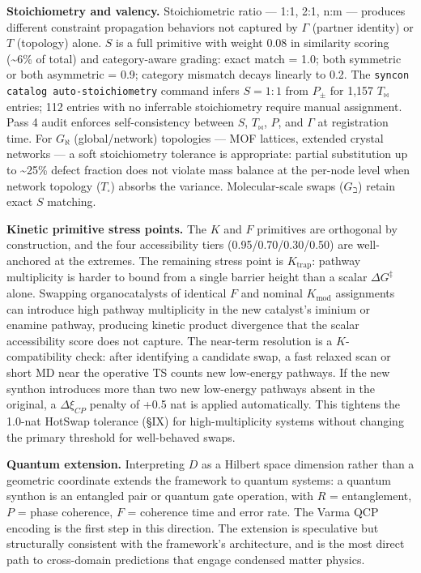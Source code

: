 \documentclass[12pt,a4paper]{article}
\begin{document}
\textbf{Stoichiometry and valency.} Stoichiometric ratio --- 1:1, 2:1, n:m --- produces different constraint propagation behaviors not captured by $\Gamma$ (partner identity) or $T$ (topology) alone. $S$ is a full primitive with weight 0.08 in similarity scoring (\textasciitilde{}6\% of total) and category-aware grading: exact match = 1.0; both symmetric or both asymmetric = 0.9; category mismatch decays linearly to 0.2. The \texttt{syncon catalog auto-stoichiometry} command infers $S = 1:1$ from $P_{\pm}$ for 1,157 $T_{\bowtie}$ entries; 112 entries with no inferrable stoichiometry require manual assignment. Pass 4 audit enforces self-consistency between $S$, $T_{\bowtie}$, $P$, and $\Gamma$ at registration time. For $G_{\aleph}$ (global/network) topologies --- MOF lattices, extended crystal networks --- a soft stoichiometry tolerance is appropriate: partial substitution up to \textasciitilde{}25\% defect fraction does not violate mass balance at the per-node level when network topology ($T_{\square}$) absorbs the variance. Molecular-scale swaps ($G_{\beth}$) retain exact $S$ matching.

\textbf{Kinetic primitive stress points.} The $K$ and $F$ primitives are orthogonal by construction, and the four accessibility tiers (0.95/0.70/0.30/0.50) are well-anchored at the extremes. The remaining stress point is $K_{\text{trap}}$: pathway multiplicity is harder to bound from a single barrier height than a scalar $\Delta G^{\ddagger}$ alone. Swapping organocatalysts of identical $F$ and nominal $K_{\text{mod}}$ assignments can introduce high pathway multiplicity in the new catalyst's iminium or enamine pathway, producing kinetic product divergence that the scalar accessibility score does not capture. The near-term resolution is a $K$-compatibility check: after identifying a candidate swap, a fast relaxed scan or short MD near the operative TS counts new low-energy pathways. If the new synthon introduces more than two new low-energy pathways absent in the original, a $\Delta\xi_{CP}$ penalty of +0.5 nat is applied automatically. This tightens the 1.0-nat HotSwap tolerance (§IX) for high-multiplicity systems without changing the primary threshold for well-behaved swaps.

\textbf{Quantum extension.} Interpreting $D$ as a Hilbert space dimension rather than a geometric coordinate extends the framework to quantum systems: a quantum synthon is an entangled pair or quantum gate operation, with $R$ = entanglement, $P$ = phase coherence, $F$ = coherence time and error rate. The Varma QCP encoding is the first step in this direction. The extension is speculative but structurally consistent with the framework's architecture, and is the most direct path to cross-domain predictions that engage condensed matter physics.
\end{document}
